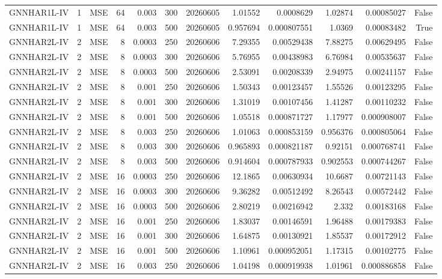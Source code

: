 \begin{tabular}{lrlrrrrrrrrr}
GNNHAR1L-IV & 1 & MSE & 64 & 0.003 & 300 & 20260605 & 1.01552 & 0.0008629 & 1.02874 & 0.00085027 & False \\
GNNHAR1L-IV & 1 & MSE & 64 & 0.003 & 500 & 20260605 & 0.957694 & 0.000807551 & 1.0369 & 0.00083482 & True \\
GNNHAR2L-IV & 2 & MSE & 8 & 0.0003 & 250 & 20260606 & 7.29355 & 0.00529438 & 7.88275 & 0.00629495 & False \\
GNNHAR2L-IV & 2 & MSE & 8 & 0.0003 & 300 & 20260606 & 5.76955 & 0.00438983 & 6.76984 & 0.00535637 & False \\
GNNHAR2L-IV & 2 & MSE & 8 & 0.0003 & 500 & 20260606 & 2.53091 & 0.00208339 & 2.94975 & 0.00241157 & False \\
GNNHAR2L-IV & 2 & MSE & 8 & 0.001 & 250 & 20260606 & 1.50343 & 0.00123457 & 1.55526 & 0.00123295 & False \\
GNNHAR2L-IV & 2 & MSE & 8 & 0.001 & 300 & 20260606 & 1.31019 & 0.00107456 & 1.41287 & 0.00110232 & False \\
GNNHAR2L-IV & 2 & MSE & 8 & 0.001 & 500 & 20260606 & 1.05518 & 0.000871727 & 1.17977 & 0.000908007 & False \\
GNNHAR2L-IV & 2 & MSE & 8 & 0.003 & 250 & 20260606 & 1.01063 & 0.000853159 & 0.956376 & 0.000805064 & False \\
GNNHAR2L-IV & 2 & MSE & 8 & 0.003 & 300 & 20260606 & 0.965893 & 0.000821187 & 0.92151 & 0.000768741 & False \\
GNNHAR2L-IV & 2 & MSE & 8 & 0.003 & 500 & 20260606 & 0.914604 & 0.000787933 & 0.902553 & 0.000744267 & False \\
GNNHAR2L-IV & 2 & MSE & 16 & 0.0003 & 250 & 20260606 & 12.1865 & 0.00630934 & 10.6687 & 0.00721143 & False \\
GNNHAR2L-IV & 2 & MSE & 16 & 0.0003 & 300 & 20260606 & 9.36282 & 0.00512492 & 8.26543 & 0.00572442 & False \\
GNNHAR2L-IV & 2 & MSE & 16 & 0.0003 & 500 & 20260606 & 2.80219 & 0.00216942 & 2.332 & 0.00183168 & False \\
GNNHAR2L-IV & 2 & MSE & 16 & 0.001 & 250 & 20260606 & 1.83037 & 0.00146591 & 1.96488 & 0.00179383 & False \\
GNNHAR2L-IV & 2 & MSE & 16 & 0.001 & 300 & 20260606 & 1.64875 & 0.00130921 & 1.85537 & 0.00172912 & False \\
GNNHAR2L-IV & 2 & MSE & 16 & 0.001 & 500 & 20260606 & 1.10961 & 0.000952051 & 1.17315 & 0.00102775 & False \\
GNNHAR2L-IV & 2 & MSE & 16 & 0.003 & 250 & 20260606 & 1.04198 & 0.000919938 & 1.01961 & 0.000886858 & False \\

\end{tabular}
